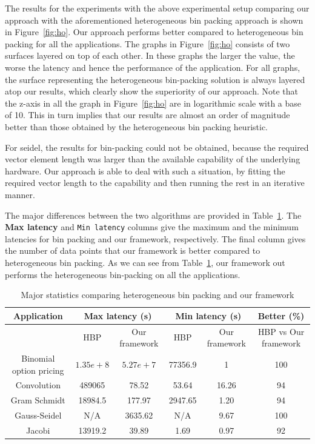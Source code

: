 The results for the experiments with the above experimental setup
comparing our approach with the aforementioned heterogeneous bin packing
approach is shown in Figure~\ref{fig:ho}. Our approach performs better
compared to heterogeneous bin packing for all the applications. The
graphs in Figure~\ref{fig:ho} consists of two surfaces layered on top of
each other. In these graphs the larger the value, the worse the latency
and hence the performance of the application. For all graphs, the
surface representing the heterogeneous bin-packing solution is always
layered atop our results, which clearly show the superiority of our
approach. Note that the z-axis in all the graph in Figure~\ref{fig:ho}
are in logarithmic scale with a base of 10. This in turn implies that
our results are almost an order of magnitude better than those obtained
by the heterogeneous bin packing heuristic.
 
For seidel, the results for bin-packing could not be obtained, because
the required vector element length was larger than the available
capability of the underlying hardware. Our approach is able to deal with
such a situation, by fitting the required vector length to the
capability and then running the rest in an iterative manner.

The major differences between the two algorithms are provided in
Table~\ref{tab:2}. The \textbf{Max latency} and \texttt{Min latency}
columns give the maximum and the minimum latencies for bin packing and
our framework, respectively. The final column gives the number of data
points that our framework is better compared to heterogeneous bin
packing. As we can see from Table~\ref{tab:2}, our framework out
performs the heterogeneous bin-packing on all the applications.

\begin{table}[t!]
  \centering
  \begin{tabular}{|c|c|c|c|c|c|}
    \hline
    \textbf{Application} & 
    \multicolumn{2}{|c|}{\textbf{Max latency (s)}} &
    \multicolumn{2}{|c|}{\textbf{Min latency (s)}} & 
    \textbf{Better (\%)} \\
    \hline
    & {HBP} & {Our framework} &
    {HBP} & {Our framework} & HBP vs Our framework\\
    \hline
    Binomial option pricing & $1.35e+8$ & $5.27e+7$ & 77356.9 & 1 & 100 \\
    \hline
    Convolution & 489065 & 78.52 & 53.64 & 16.26 & 94\\
    \hline
    Gram Schmidt & 18984.5 & 177.97 & 2947.65 & 1.20 & 94\\
    \hline
    Gauss-Seidel & N/A & 3635.62 & N/A & 9.67 & 100\\
    \hline
    Jacobi & 13919.2 & 39.89 & 1.69 & 0.97 & 92\\
    \hline
  \end{tabular}
  \caption{Major statistics comparing heterogeneous bin packing and our framework}
  \label{tab:2}
\end{table}

